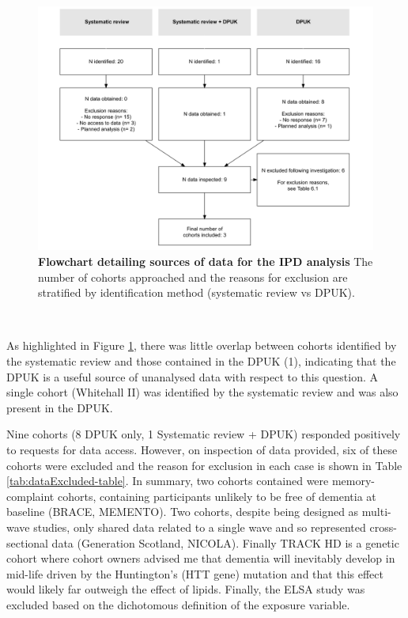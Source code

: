 \documentclass[a4paper, twoside]{templates/ociamthesis}
\begin{document}
~





\begin{figure}[H]
\includegraphics[width=1\linewidth]{figures/ipd/cohortFlowchart} \caption[Flowchart detailing sources of data for the IPD analysis]{\textbf{Flowchart detailing sources of data for the IPD analysis} The number of cohorts approached and the reasons for exclusion are stratified by identification method (systematic review vs DPUK).}\label{fig:cohortFlowchart}
\end{figure}

~

As highlighted in Figure \ref{fig:cohortFlowchart}, there was little overlap between cohorts identified by the systematic review and those contained in the DPUK (1), indicating that the DPUK is a useful source of unanalysed data with respect to this question. A single cohort (Whitehall II) was identified by the systematic review and was also present in the DPUK.

Nine cohorts (8 DPUK only, 1 Systematic review + DPUK) responded positively to requests for data access. However, on inspection of data provided, six of these cohorts were excluded and the reason for exclusion in each case is shown in Table \ref{tab:dataExcluded-table}. In summary, two cohorts contained were memory-complaint cohorts, containing participants unlikely to be free of dementia at baseline (BRACE, MEMENTO). Two cohorts, despite being designed as multi-wave studies, only shared data related to a single wave and so represented cross-sectional data (Generation Scotland, NICOLA). Finally TRACK HD is a genetic cohort where cohort owners advised me that dementia will inevitably develop in mid-life driven by the Huntington's (HTT gene) mutation and that this effect would likely far outweigh the effect of lipids. Finally, the ELSA study was excluded based on the dichotomous definition of the exposure variable.
\end{document}
